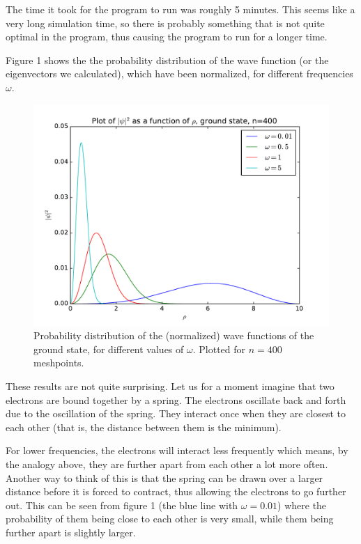 \documentclass[12pt]{article}
\begin{document}
The time it took for the program to run was roughly 5 minutes. This seems like a very long simulation time, so there is probably something that is not quite optimal in the program, thus causing the program to run for a longer time.

Figure 1 shows the the probability distribution of the wave function (or the eigenvectors we calculated), which have been normalized, for different frequencies $\omega$.
\begin{figure}[hbtp]
\centering
\includegraphics[width=\linewidth]{Plots/Plot_groundstate_n400.pdf}
\caption{Probability distribution of the (normalized) wave functions of the ground state, for different values of $\omega$. Plotted for $n=400$ meshpoints.}
\end{figure}
These results are not quite surprising. Let us for a moment imagine that two electrons are bound together by a spring. The electrons oscillate back and forth due to the oscillation of the spring. They interact once when they are closest to each other (that is, the distance between them is the minimum).

For lower frequencies, the electrons will interact less frequently which means, by the analogy above, they are further apart from each other a lot more often. Another way to think of this is that the spring can be drawn over a larger distance before it is forced to contract, thus allowing the electrons to go further out. This can be seen from figure 1 (the blue line with $\omega = 0.01$) where the probability of them being close to each other is very small, while them being further apart is slightly larger.
\end{document}
